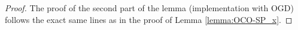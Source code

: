 \documentclass[a4paper,12pt]{article}
\newcommand{\mY}{\mathcal{Y}}
\newcommand{\mX}{\mathcal{X}}
\newcommand{\tY}{\tilde{\mathcal{Y}}}
\newcommand{\mA}{\mathcal{A}}
\begin{document}
\begin{proof}

The proof of the second part of the lemma (implementation with OGD) follows the exact same lines as in the proof of Lemma \ref{lemma:OCO-SP_x}.
\end{proof}
\end{document}
